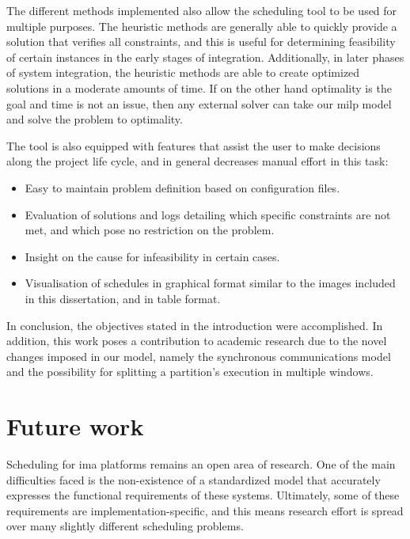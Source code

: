 \documentclass[main.tex]{subfiles}
\begin{document}
The different methods implemented also allow the scheduling tool to be used for multiple purposes.
The heuristic methods are generally able to quickly provide a solution that verifies all constraints, and this is useful for determining feasibility of certain instances in the early stages of integration.
Additionally, in later phases of system integration, the heuristic methods are able to create optimized solutions in a moderate amounts of time.
If on the other hand optimality is the goal and time is not an issue, then any external solver can take our \gls{milp} model and solve the problem to optimality.

The tool is also equipped with features that assist the user to make decisions along the project life cycle, and in general decreases manual effort in this task:
\begin{itemize}
    \addtolength{\itemsep}{-0.8em}
    \item Easy to maintain problem definition based on configuration files.
    \item Evaluation of solutions and logs detailing which specific constraints are not met, and which pose no restriction on the problem.
    \item Insight on the cause for infeasibility in certain cases.
    \item Visualisation of schedules in graphical format similar to the images included in this dissertation, and in table format.
    \addtolength{\itemsep}{0.8em}
\end{itemize}

In conclusion, the objectives stated in the introduction were accomplished.
In addition, this work poses a contribution to academic research due to the novel changes imposed in our model, namely the synchronous communications model and the possibility for splitting a partition's execution in multiple windows.


\section{Future work}

Scheduling for \gls{ima} platforms remains an open area of research.
One of the main difficulties faced is the non-existence of a standardized model that accurately expresses the functional requirements of these systems.
Ultimately, some of these requirements are implementation-specific, and this means research effort is spread over many slightly different scheduling problems.
\end{document}
